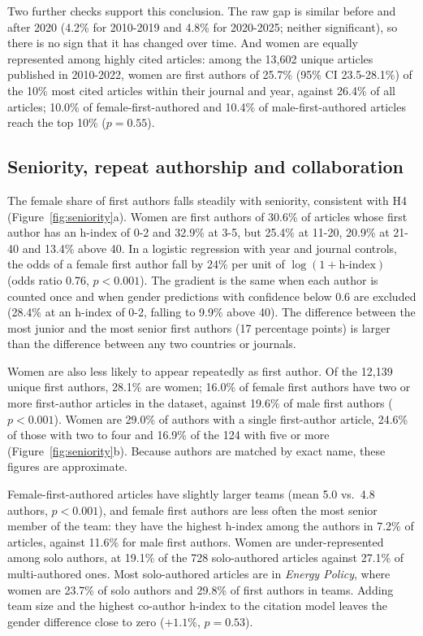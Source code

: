 \documentclass[preprint,12pt,number]{elsarticle}
\begin{document}
Two further checks support this conclusion. The raw gap is similar before and after 2020 (4.2\% for 2010-2019 and 4.8\% for 2020-2025; neither significant), so there is no sign that it has changed over time. And women are equally represented among highly cited articles: among the 13,602 unique articles published in 2010-2022, women are first authors of 25.7\% (95\% CI 23.5-28.1\%) of the 10\% most cited articles within their journal and year, against 26.4\% of all articles; 10.0\% of female-first-authored and 10.4\% of male-first-authored articles reach the top 10\% ($p=0.55$).

\subsection{Seniority, repeat authorship and collaboration}

The female share of first authors falls steadily with seniority, consistent with H4 (Figure~\ref{fig:seniority}a). Women are first authors of 30.6\% of articles whose first author has an h-index of 0-2 and 32.9\% at 3-5, but 25.4\% at 11-20, 20.9\% at 21-40 and 13.4\% above 40. In a logistic regression with year and journal controls, the odds of a female first author fall by 24\% per unit of $\log(1+\text{h-index})$ (odds ratio 0.76, $p<0.001$). The gradient is the same when each author is counted once and when gender predictions with confidence below 0.6 are excluded (28.4\% at an h-index of 0-2, falling to 9.9\% above 40). The difference between the most junior and the most senior first authors (17 percentage points) is larger than the difference between any two countries or journals.

Women are also less likely to appear repeatedly as first author. Of the 12,139 unique first authors, 28.1\% are women; 16.0\% of female first authors have two or more first-author articles in the dataset, against 19.6\% of male first authors ($p<0.001$). Women are 29.0\% of authors with a single first-author article, 24.6\% of those with two to four and 16.9\% of the 124 with five or more (Figure~\ref{fig:seniority}b). Because authors are matched by exact name, these figures are approximate.

Female-first-authored articles have slightly larger teams (mean 5.0 vs.\ 4.8 authors, $p<0.001$), and female first authors are less often the most senior member of the team: they have the highest h-index among the authors in 7.2\% of articles, against 11.6\% for male first authors. Women are under-represented among solo authors, at 19.1\% of the 728 solo-authored articles against 27.1\% of multi-authored ones. Most solo-authored articles are in \textit{Energy Policy}, where women are 23.7\% of solo authors and 29.8\% of first authors in teams. Adding team size and the highest co-author h-index to the citation model leaves the gender difference close to zero ($+1.1\%$, $p=0.53$).
\end{document}
